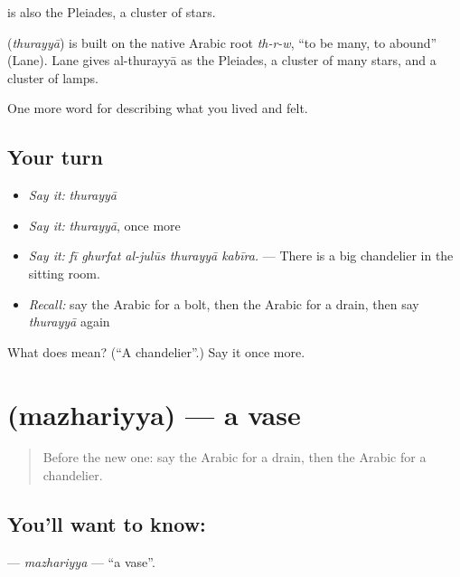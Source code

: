  is also the Pleiades, a cluster of stars.

\begin{cousinweb}
\textbf{} (\emph{thurayyā}) is built on the native Arabic root \emph{th-r-w}, \textquotedblleft{}to be many, to abound\textquotedblright{} (Lane). Lane gives al-thurayyā as the Pleiades, a cluster of many stars, and a cluster of lamps.
\end{cousinweb}

\begin{grammarlens}[title={What you've built}]
One more word for describing what you lived and felt.
\end{grammarlens}

\subsection*{Your turn}
\begin{itemize}
\raggedright
  \item \emph{Say it:} \emph{thurayyā}
  \item \emph{Say it:} \emph{thurayyā}, once more
  \item \emph{Say it:} \emph{fī ghurfat al-julūs thurayyā kabīra.} — There is a big chandelier in the sitting room.
  \item \emph{Recall:} say the Arabic for a bolt, then the Arabic for a drain, then say \emph{thurayyā} again
\end{itemize}

\begin{tcolorbox}[breakable,colback=teal!4,colframe=teal!35!black,title={Before you move on}]
What does  mean? (\textquotedblleft{}A chandelier\textquotedblright{}.) Say it once more.
\end{tcolorbox}
\section[\texorpdfstring{\ar{مزهرية} (mazhariyya)}{مزهرية (mazhariyya)}]{ (mazhariyya) — a vase}

\label{lesson:AR-C550-mazhariyya}



\begin{quote}
Before the new one: say the Arabic for a drain, then the Arabic for a chandelier.
\end{quote}

\subsection*{You'll want to know: }
\textbf{} — \emph{mazhariyya} — \textquotedblleft{}a vase\textquotedblright{}.

